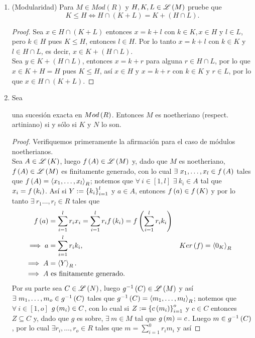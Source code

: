 \documentclass{article}
\begin{document}
\begin{enumerate}[label=\textbf{Ej \arabic*.}]
\item (Modularidad) Para $M\in Mod(R)$ y $H,K,L\in \mathscr{L}\left(M\right) $ pruebe que 
\[K\leq H\iff H\cap (K+L)=K+(H\cap L).\]
\begin{proof}
Sea $x\in H\cap(K+L)$ entonces $x=k+l$ con $k\in K, x\in H$ y $l\in L$, pero $k\in H$ pues $K\leq H$, entonces $l\in H$. Por lo tanto
$x=k+l$ con $k\in K$ y $l\in H\cap L$, es decir, $x\in K+(H\cap L)$.\\

Sea $y\in K+(H\cap L)$, entonces $x=k+r$ para alguna $r\in H\cap L$, por lo que $x\in K+H=H$ pues $K\leq H$, así $x\in H$ y $x=k+r$
con $k\in K$ y $r\in L$, por lo que $x\in H\cap(K+L)$.
\end{proof}

\item Sea
\begin{center}
\end{center} 
una sucesión exacta en $Mod\left(R\right)$. Entonces $M$ es noetheriano (respect. artiniano) si y sólo si $K$ y $N$ lo son.
\begin{proof}
	Verifiquemos primeramente la afirmación para el caso de módulos noetherianos.\\
	\boxed{\implies} Sea $A\in\mathscr{L}\left(K\right)$, luego $f\left(A\right)\in\mathscr{L}\left(M\right)$ y, dado que $M$ es noetheriano, $f\left(A\right)\in\mathscr{L}\left(M\right)$ es finitamente generado, con lo cual $\exists\ x_1,\dotsc,x_l\in f\lrprth{A}$ tales que $f\left(A\right)=\left< x_1,\dotsc,x_l\right>_{R}$; notemos que $\forall\ i\in[1,l]$ $\exists\ k_i\in A$ tal que $x_i=f\left(k_i\right)$. Así si $Y:={\left\{{k}_{i}\right\}}_{i=1}^{l}$ y $a\in A$, entonces $f\left(a\right)\in f\left(K\right)$ y por lo tanto $\exists\ r_1\dots,r_l\in R$ tales que
	\begin{align*}
		f\left(a\right)&=\sum_{i=1}^{l}r_ix_i=\sum_{i=1}^{l}r_if\left(k_i\right)=f\left(\sum_{i=1}^{l}r_ik_i\right)\\
		\implies a&=\sum_{i=1}^{l}r_ik_i, && Ker\left(f\right)=\left< 0_K\right>_{R}\\
		\implies A&=\left< Y\right>_{R}.\\
		\implies A&\text{ es finitamente generado}.
	\end{align*} 
Por su parte sea $C\in\mathscr{L}\left(N\right)$, luego $g^{-1}\left(C\right)\in\mathscr{L}\left(M\right)$ y así $\exists\ m_1,\dotsc,m_o\in g^{-1}\left(C\right)$ tales que $g^{-1}\left(C\right)=\left< m_1,\dotsc,m_l\right>_{R}$; notemos que $\forall\ i\in[1,o]$ $g\left(m_i\right)\in C$, con lo cual  si $Z:=\left\{c\left(m_i\right)\right\}_{i=1}^{o}$ y $c\in C$ entonces $Z\subseteq C$ y, dado que $g$ es sobre, $\exists\ m\in M$ tal que $g\left(m\right)=c$. Luego $m\in g^{-1}\left(C\right)$, por lo cual $\exists r_i,\dotsc,r_o\in R$ tales que $m= \sum_{i=1}^{0}r_im_i$ y así

\end{proof}
\end{enumerate}
\end{document}
